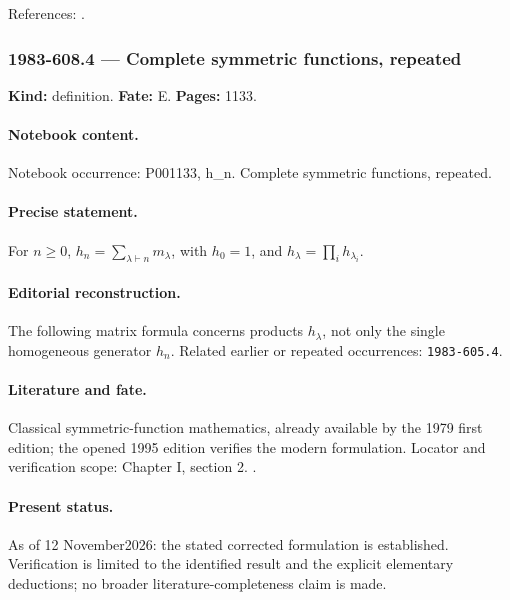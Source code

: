 \noindent References: \citep{macdonald1995symmetric}.\par

\subsubsection{1983-608.4 --- Complete symmetric functions, repeated}

\label{item:1983-608.4}

\noindent\textbf{Kind:} definition. \textbf{Fate:} E. \textbf{Pages:} 1133.\par

\paragraph{Notebook content.} Notebook occurrence: P001133, h_n. Complete symmetric functions, repeated.

\paragraph{Precise statement.} For \(n\ge0\), \(h_n=\sum_{\lambda\vdash n}m_\lambda\), with \(h_0=1\), and \(h_\lambda=\prod_i h_{\lambda_i}\).

\paragraph{Editorial reconstruction.} The following matrix formula concerns products \(h_\lambda\), not only the single homogeneous generator \(h_n\). Related earlier or repeated occurrences: \texttt{1983-605.4}.

\paragraph{Literature and fate.} Classical symmetric-function mathematics, already available by the 1979 first edition; the opened 1995 edition verifies the modern formulation. Locator and verification scope: Chapter I, section 2. \cite{macdonald1995symmetric}.

\paragraph{Present status.} As of 12 November2026: the stated corrected formulation is established. Verification is limited to the identified result and the explicit elementary deductions; no broader literature-completeness claim is made.

